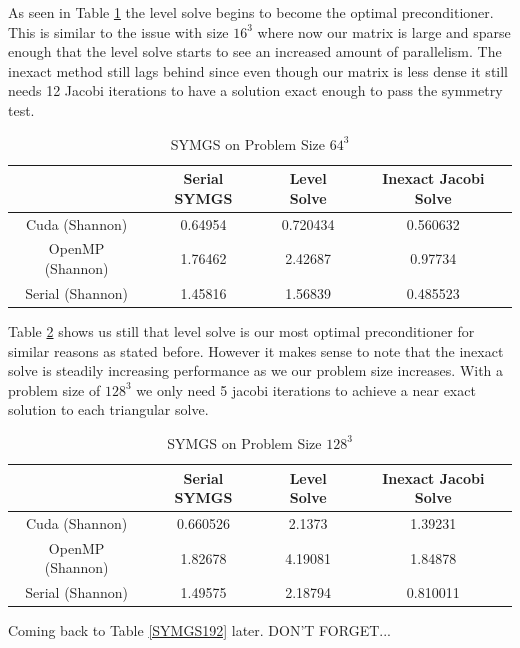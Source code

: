 \documentclass{ccr15}
\begin{document}
As seen in Table \ref{SYMGS64} the level solve begins to become the optimal preconditioner. This
is similar to the issue with size $16^3$ where now our matrix is large and sparse enough that
the level solve starts to see an increased amount of parallelism. The inexact method still lags
behind since even though our matrix is less dense it still needs 12 Jacobi iterations to have
a solution exact enough to pass the symmetry test.

\begin{table}[h]
\begin{center}
\begin{tabular}{|c||c|c|c|}
\hline
& Serial SYMGS & Level Solve & Inexact Jacobi Solve \\
\hline \hline
Cuda (Shannon) & 0.64954 & 0.720434 & 0.560632 \\
\hline
OpenMP (Shannon) & 1.76462 & 2.42687 & 0.97734 \\
\hline
Serial (Shannon) & 1.45816 & 1.56839 & 0.485523 \\
\hline
\end{tabular}
\caption{SYMGS on Problem Size $64^3$}
\label{SYMGS64}
\end{center}
\end{table}

Table \ref{SYMGS128} shows us still that level solve is our most optimal preconditioner for
similar reasons as stated before. However it makes sense to note that the inexact solve is
steadily increasing performance as we our problem size increases. With a problem size of $128^3$
we only need 5 jacobi iterations to achieve a near exact solution to each triangular solve.

\begin{table}[h]
\begin{center}
\begin{tabular}{|c||c|c|c|}
\hline
& Serial SYMGS & Level Solve & Inexact Jacobi Solve \\
\hline \hline
Cuda (Shannon) & 0.660526 & 2.1373 & 1.39231 \\
\hline
OpenMP (Shannon) & 1.82678 & 4.19081 & 1.84878 \\
\hline
Serial (Shannon) & 1.49575 & 2.18794 & 0.810011 \\
\hline
\end{tabular}
\caption{SYMGS on Problem Size $128^3$}
\label{SYMGS128}
\end{center}
\end{table}

Coming back to Table \ref{SYMGS192} later. DON'T FORGET...
\end{document}
